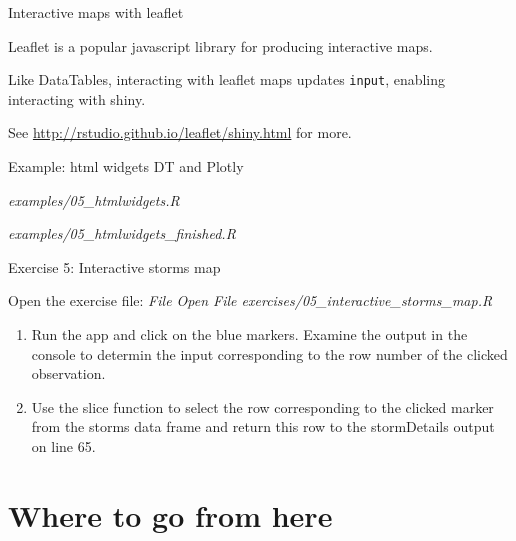\documentclass[
  12pt,
  ignorenonframetext,
]{beamer}
\providecommand{\tightlist}{%
  \setlength{\itemsep}{0pt}\setlength{\parskip}{0pt}}
\begin{document}
\begin{frame}[fragile]{Interactive maps with leaflet}
\protect\hypertarget{interactive-maps-with-leaflet}{}

Leaflet is a popular javascript library for producing interactive maps.

Like DataTables, interacting with leaflet maps updates \texttt{input},
enabling interacting with shiny.

See \url{http://rstudio.github.io/leaflet/shiny.html} for more.

\end{frame}

\begin{frame}{Example: html widgets DT and Plotly}
\protect\hypertarget{example-html-widgets-dt-and-plotly}{}

\begin{description}
\tightlist
\item[Start]
\emph{examples/05\_htmlwidgets.R}
\item[Finished]
\emph{examples/05\_htmlwidgets\_finished.R}
\end{description}

\end{frame}

\begin{frame}{Exercise 5: Interactive storms map}
\protect\hypertarget{exercise-5-interactive-storms-map}{}

Open the exercise file: \emph{File \rightarrow Open File
\rightarrow exercises/05\_interactive\_storms\_map.R}

\begin{enumerate}
\item
  Run the app and click on the blue markers. Examine the output in the
  console to determin the input corresponding to the row number of the
  clicked observation.
\item
  Use the slice function to select the row corresponding to the clicked
  marker from the storms data frame and return this row to the
  stormDetails output on line 65.
\end{enumerate}

\end{frame}

\hypertarget{where-to-go-from-here}{%
\section{Where to go from here}\label{where-to-go-from-here}}
\end{document}
